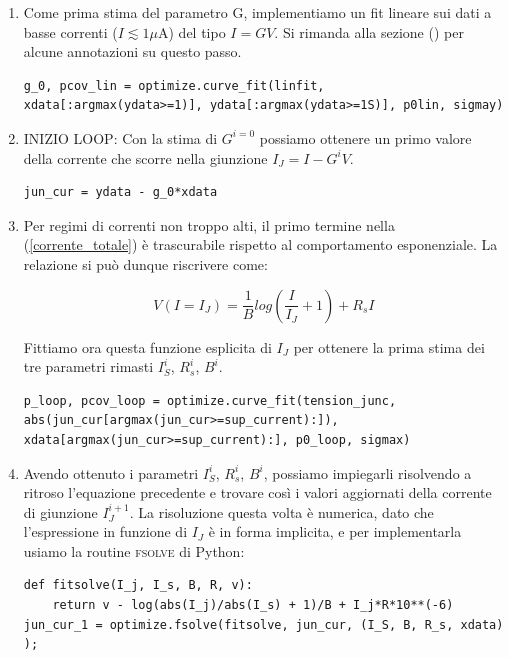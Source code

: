 \documentclass[10pt,letterpaper]{article}
\begin{document}
\begin{enumerate}

\item Come prima stima del parametro G, implementiamo un fit lineare sui dati a basse correnti ($I \lesssim 1 \mu$A) del tipo $I = GV$. Si rimanda alla sezione () per alcune annotazioni su questo passo.

\begin{lstlisting}
g_0, pcov_lin = optimize.curve_fit(linfit, 
xdata[:argmax(ydata>=1)], ydata[:argmax(ydata>=1S)], p0lin, sigmay)
\end{lstlisting}

\item INIZIO LOOP: Con la stima di $G^{i=0}$ possiamo ottenere un primo valore della corrente che scorre nella giunzione $I_J = I - G^i V$.

\begin{lstlisting}
jun_cur = ydata - g_0*xdata
\end{lstlisting}

\item Per regimi di correnti non troppo alti, il primo termine nella (\ref{corrente_totale}) è trascurabile rispetto al comportamento esponenziale. La relazione si può dunque riscrivere come:

\begin{equation}
V(I=I_J) = \frac{1}{B} log \left(\frac{I}{I_J} + 1 \right) + R_s I
\end{equation}

Fittiamo ora questa funzione esplicita di $I_J$ per ottenere la prima stima dei tre parametri rimasti $I_S^i$, $R_s^i$, $B^i$.

\begin{lstlisting}
p_loop, pcov_loop = optimize.curve_fit(tension_junc, 
abs(jun_cur[argmax(jun_cur>=sup_current):]), 
xdata[argmax(jun_cur>=sup_current):], p0_loop, sigmax)
\end{lstlisting}


\item Avendo ottenuto i parametri $I_S^i$, $R_s^i$, $B^i$, possiamo impiegarli risolvendo a ritroso l'equazione precedente e trovare così i valori aggiornati della corrente di giunzione $I_{J}^{i+1}$. La risoluzione questa volta è numerica, dato che l'espressione in funzione di $I_J$ è in forma implicita, e per implementarla usiamo la routine \textsc{fsolve} di Python:

\begin{lstlisting}
def fitsolve(I_j, I_s, B, R, v):
    return v - log(abs(I_j)/abs(I_s) + 1)/B + I_j*R*10**(-6)
jun_cur_1 = optimize.fsolve(fitsolve, jun_cur, (I_S, B, R_s, xdata) );
\end{lstlisting}


\end{enumerate}
\end{document}
